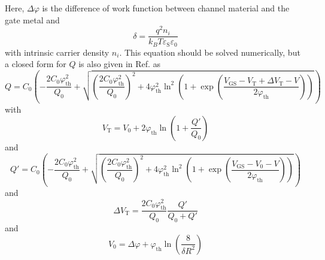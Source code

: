 \documentclass[11pt,uplatex,a4paper]{jsarticle}
\begin{document}
Here, $\Delta \varphi$ is the difference of work function between channel material and the gate metal and
\begin{equation}
 \delta = \frac{q^2n_i}{k_B T \varepsilon_{\mathrm{S}}\varepsilon_0}
\end{equation}
with intrinsic carrier density $n_i$.
This equation should be solved numerically, but
a closed form for $Q$ is also given in Ref. \cite{Iniguez:2005ub} as
\begin{equation}
 Q = C_0
  \left(
   -\frac{2 C_0 \varphi_{\mathrm{th}}^2}{Q_0} +
   \sqrt{\left(\frac{2 C_0 \varphi_{\mathrm{th}}^2}{Q_0}\right)^2
   + 4 \varphi_{\mathrm{th}}^2 \ln^2
   \left(
	1+ \exp \left(\frac{V_{\mathrm{GS}}-V_{\mathrm{T}}+\Delta V_{\mathrm{T}} -V}{2 \varphi_{\mathrm{th}}}
			\right)
   \right)
   }
  \right)
\end{equation}
with
\begin{equation}
 V_{\mathrm{T}} = V_0 + 2 \varphi_{\mathrm{th}} \ln \left(1+\frac{Q'}{Q_0}\right)
\end{equation}
and
\begin{equation}
 Q'=
  C_0
  \left(
   -\frac{2 C_0 \varphi_{\mathrm{th}}^2}{Q_0} +
   \sqrt{\left(\frac{2 C_0 \varphi_{\mathrm{th}}^2}{Q_0}\right)^2
   + 4 \varphi_{\mathrm{th}}^2 \ln^2
   \left(
	1+ \exp \left(\frac{V_{\mathrm{GS}}-V_0 -V}{2 \varphi_{\mathrm{th}}}
			\right)
   \right)
   }
  \right)
\end{equation}
and
\begin{equation}
 \Delta V_{\mathrm{T}} = \frac{2C_0\varphi_{\mathrm{th}}^2}{Q_0}
  \frac{Q'}{Q_0 + Q'}
\end{equation}
and
\begin{equation}
 V_0 = \Delta \varphi + \varphi_{\mathrm{th}} \ln \left(\frac{8}{\delta R^2}\right)
\end{equation}
\end{document}
